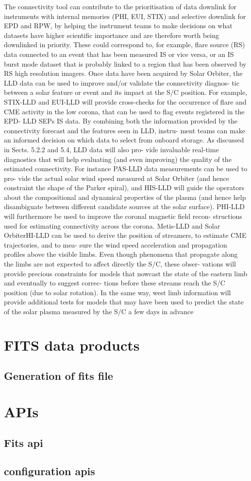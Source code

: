 \documentclass[a4paper,10pt]{article}
\begin{document}
The connectivity tool can contribute to the prioritisation of data
downlink for instruments with internal memories (PHI, EUI,
STIX) and selective downlink for EPD and RPW, by helping the
instrument teams to make decisions on what datasets have higher
scientific importance and are therefore worth being downlinked
in priority. These could correspond to, for example, flare source
(RS) data connected to an event that has been measured IS or
vice versa, or an IS burst mode dataset that is probably linked to
a region that has been observed by RS high resolution imagers.
Once data have been acquired by Solar Orbiter, the LLD data
can be used to improve and/or validate the connectivity diagnos-
tic between a solar feature or event and its impact at the S/C
position. For example, STIX-LLD and EUI-LLD will provide
cross-checks for the occurrence of flare and CME activity in the
low corona, that can be used to flag events registered in the EPD-
LLD SEPs IS data. By combining both the information provided
by the connectivity forecast and the features seen in LLD, instru-
ment teams can make an informed decision on which data to
select from onboard storage.
As discussed in Sects. 5.2.2 and 5.4, LLD data will also pro-
vide invaluable real-time diagnostics that will help evaluating
(and even improving) the quality of the estimated connectivity.
For instance PAS-LLD data measurements can be used to pro-
vide the actual solar wind speed measured at Solar Orbiter (and
hence constraint the shape of the Parker spiral), and HIS-LLD
will guide the operators about the compositional and dynamical
properties of the plasma (and hence help disambiguate between
different candidate sources at the solar surface). PHI-LLD will
furthermore be used to improve the coronal magnetic field recon-
structions used for estimating connectivity across the corona.
Metis-LLD and Solar OrbiterHI-LLD can be used to derive the
position of streamers, to estimate CME trajectories, and to mea-
sure the wind speed acceleration and propagation profiles above
the visible limbs. Even though phenomena that propagate along
the limbs are not expected to affect directly the S/C, these obser-
vations will provide precious constraints for models that nowcast
the state of the eastern limb and eventually to suggest correc-
tions before these streams reach the S/C position (due to solar
rotation). In the same way, west limb information will provide
additional tests for models that may have been used to predict
the state of the solar plasma measured by the S/C a few days in
advance


\section{FITS data products}
\subsection{Generation of fits file}

\section{ APIs}
\subsection{Fits api}
\subsection{configuration apis}
\end{document}
